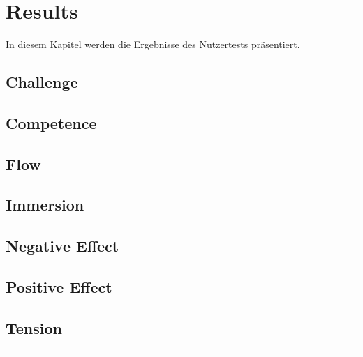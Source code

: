 \chapter{Results} %
In diesem Kapitel werden die Ergebnisse des Nutzertests präsentiert.

\section{Challenge}
\section{Competence}
\section{Flow}
\section{Immersion}
\section{Negative Effect}
\section{Positive Effect}
\section{Tension}


\hfil\rule{0.4\textwidth}{0.4pt}